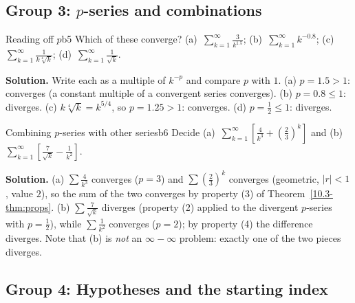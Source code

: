 \documentclass[11pt]{article}
\begin{document}
\subsection*{Group 3: $p$-series and combinations}

\begin{exmp}{Reading off $p$}{b5}
Which of these converge? (a)~$\displaystyle\sum_{k=1}^\infty\frac3{k^{1.5}}$; (b)~$\displaystyle\sum_{k=1}^\infty k^{-0.8}$; (c)~$\displaystyle\sum_{k=1}^\infty\frac1{k\sqrt[4]{k}}$; (d)~$\displaystyle\sum_{k=1}^\infty\frac{1}{\sqrt{k}}$.

\textbf{Solution.} Write each as a multiple of $k^{-p}$ and compare $p$ with $1$. (a) $p=1.5>1$: converges (a constant multiple of a convergent series converges). (b) $p=0.8\le1$: diverges. (c) $k\sqrt[4]k=k^{5/4}$, so $p=1.25>1$: converges. (d) $p=\frac12\le1$: diverges.
\end{exmp}

\begin{exmp}{Combining $p$-series with other series}{b6}
Decide (a)~$\displaystyle\sum_{k=1}^\infty\left[\frac4{k^3}+\left(\frac23\right)^k\right]$ and (b)~$\displaystyle\sum_{k=1}^\infty\left[\frac7{\sqrt k}-\frac1{k^2}\right]$.

\textbf{Solution.} (a) $\sum\frac4{k^3}$ converges ($p=3$) and $\sum\left(\frac23\right)^k$ converges (geometric, $|r|<1$, value $2$), so the sum of the two converges by property (3) of Theorem~\ref{10.3-thm:props}. (b) $\sum\frac7{\sqrt k}$ diverges (property (2) applied to the divergent $p$-series with $p=\frac12$), while $\sum\frac1{k^2}$ converges ($p=2$); by property (4) the difference diverges. Note that (b) is \emph{not} an $\infty-\infty$ problem: exactly one of the two pieces diverges.
\end{exmp}

\subsection*{Group 4: Hypotheses and the starting index}
\end{document}
